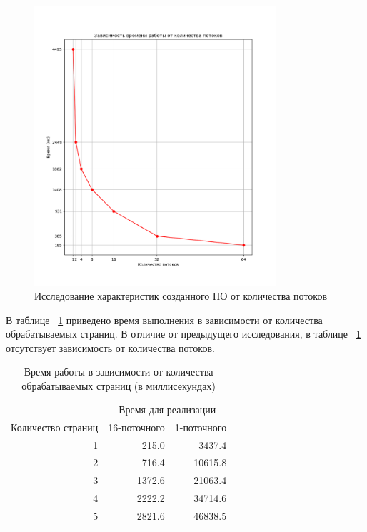 \begin{figure}[h!]
    \centering
    \includegraphics[width=0.8\textwidth]{images/image1}
    \caption{Исследование характеристик созданного ПО от количества потоков}
    \label{fig:image1}
\end{figure}


\clearpage

В таблице ~\ref{tbl:time_measurements2} приведено время выполнения в зависимости
от количества обрабатываемых страниц. В отличие от предыдущего исследования,
в таблице ~\ref{tbl:time_measurements2} отсутствует зависимость от количества
потоков.

\begin{table}[h]
	\begin{center}
		\begin{threeparttable}
		\captionsetup{justification=raggedright,singlelinecheck=off}
		\caption{Время работы в зависимости от количества обрабатываемых страниц (в миллисекундах)}
		\label{tbl:time_measurements2}
                \begin{tabular}{|r|r|r|}
			\hline 
			& \multicolumn{2}{c|}{Время для реализации} \\
                        \cline{2-3}
			Количество страниц & 16-поточного & 1-поточного\\
			\hline
                        1 & 215.0 & 3437.4 \\
                         \hline
                        2 & 716.4 & 10615.8 \\
                         \hline
                        3 & 1372.6 & 21063.4 \\
                         \hline
                        4 & 2222.2 & 34714.6 \\
                         \hline
                        5 & 2821.6 & 46838.5 \\
                         \hline
		\end{tabular}
		\end{threeparttable}
    \end{center}
\end{table}

